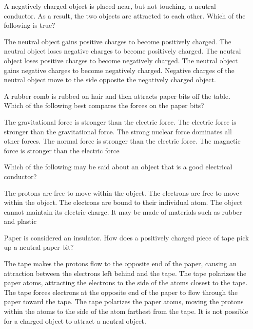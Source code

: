 \documentclass{../../../oss-ap12ibhl}
\begin{document}
\begin{questions}
  \question A negatively charged object is placed near, but not touching, a
  neutral conductor. As a result, the two objects are attracted to each other.
  Which of the following is true?
  \begin{choices}
    \choice The neutral object gains positive charges to become positively
    charged.
    \choice The neutral object loses negative charges to become positively
    charged.
    \choice The neutral object loses positive charges to become negatively
    charged.
    \choice The neutral object gains negative charges to become negatively
    charged.
    \choice Negative charges of the neutral object move to the side opposite
    the negatively charged object.
  \end{choices}

  \question A rubber comb is rubbed on hair and then attracts paper bits off the
  table. Which of the following best compares the forces on the paper bits?
  \begin{choices}
    \choice The gravitational force is stronger than the electric force.
    \choice The electric force is stronger than the gravitational force.
    \choice The strong nuclear force dominates all other forces.
    \choice The normal force is stronger than the electric force.
    \choice The magnetic force is stronger than the electric force
  \end{choices}

  \question Which of the following may be said about an object that is a good
  electrical conductor?
  \begin{choices}
    \choice The protons are free to move within the object.
    \choice The electrons are free to move within the object.
    \choice The electrons are bound to their individual atom.
    \choice The object cannot maintain its electric charge.
    \choice It may be made of materials such as rubber and plastic
  \end{choices}
  
  \question Paper is considered an insulator. How does a positively charged
  piece of tape pick up a neutral paper bit?
  \begin{choices}
    \choice The tape makes the protons flow to the opposite end of the paper,
    causing an attraction between the electrons left behind and the tape.
    \choice The tape polarizes the paper atoms, attracting the electrons to the
    side of the atoms closest to the tape.
    \choice The tape forces electrons at the opposite end of the paper to flow
    through the paper toward the tape.
    \choice The tape polarizes the paper atoms, moving the protons within the
    atoms to the side of the atom farthest from the tape.
    \choice It is not possible for a charged object to attract a neutral object.
  \end{choices}
  \vspace{.7in}


\end{questions}
\end{document}
